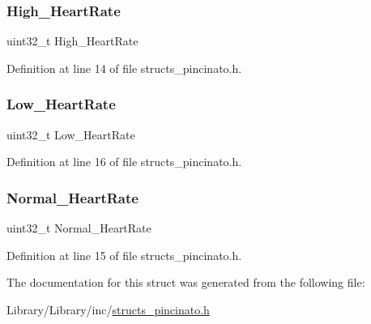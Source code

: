 \mbox{\label{struct_table_a083b719ad6c79f4ae24629ff524568c5}} 
\subsubsection{\texorpdfstring{High\+\_\+\+Heart\+Rate}{High\_HeartRate}}
{\footnotesize\ttfamily uint32\+\_\+t High\+\_\+\+Heart\+Rate}



Definition at line 14 of file structs\+\_\+pincinato.\+h.

\mbox{\label{struct_table_abee6357a367856ae631545d1499ae7cd}} 
\subsubsection{\texorpdfstring{Low\+\_\+\+Heart\+Rate}{Low\_HeartRate}}
{\footnotesize\ttfamily uint32\+\_\+t Low\+\_\+\+Heart\+Rate}



Definition at line 16 of file structs\+\_\+pincinato.\+h.

\mbox{\label{struct_table_a2639bf590ecf1e2847a7cc426eb9286b}} 
\subsubsection{\texorpdfstring{Normal\+\_\+\+Heart\+Rate}{Normal\_HeartRate}}
{\footnotesize\ttfamily uint32\+\_\+t Normal\+\_\+\+Heart\+Rate}



Definition at line 15 of file structs\+\_\+pincinato.\+h.



The documentation for this struct was generated from the following file\+:\begin{DoxyCompactItemize}
\item 
Library/\+Library/inc/\mbox{\hyperlink{structs__pincinato_8h}{structs\+\_\+pincinato.\+h}}\end{DoxyCompactItemize}
